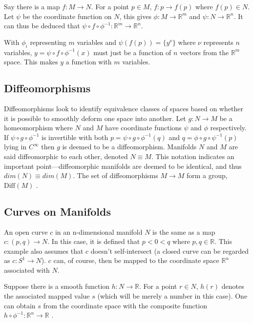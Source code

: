 \documentclass[fleqn, twocolumn, 10pt]{article}
\begin{document}
Say there is a map $f: M \to N$. For a point $p \in M$, $f: p \to f(p)$ where $f(p) \in N$. Let $\psi$ be the coordinate function on $N$, this gives $\phi: M \to \mathbb{R}^m$ and $\psi: N \to \mathbb{R}^n$. It can thus be deduced that $\psi \circ f \circ \phi^{-1} : \mathbb{R}^m \to \mathbb{R}^n$. 

With $\phi_i$ representing $m$ variables and $\psi (f(p))=\{y^\nu \}$ where $\nu$ represents $n$ variables, $y = \psi \circ f \circ \phi^{-1}(x)$ must just be a function of $n$ vectors from the $\mathbb{R}^m$ space. This makes $y$ a function with $m$ variables.


\subsection{Diffeomorphisms}

Diffeomorphisms look to identify equivalence classes of spaces based on whether it is possible to smoothly deform one space into another. Let $g: N \to M$ be a homeomorphism where $N$ and $M$ have coordinate functions $\psi$ and $\phi$ respectively. If $\psi \circ g \circ \phi^{-1}$ is invertible with both $p = \psi \circ g \circ \phi^{-1}(q)$ and $q = \phi \circ g \circ \psi^{-1}(p)$ lying in $C^\infty$ then $g$ is deemed to be a diffeomorphism. Manifolds $N$ and $M$ are said diffeomorphic to each other, denoted $N \equiv M$. This notation indicates an important point---diffeomorphic manifolds are deemed to be identical, and thus $dim(N) \equiv dim(M)$. The set of diffeomorphisms $M \to M$ form a group, $\text{Diff}(M)$ \cite{nakahara2003geometry, sussman2013functional, kai2015lam}.

\subsection{Curves on Manifolds}

An open curve $c$ in an n-dimensional manifold $N$ is the same as a map $c:(p,q) \to N$. In this case, it is defined that $p < 0 < q$ where $p,q \in \mathbb{R}$. This example also assumes that $c$ doesn't self-intersect (a closed curve can be regarded as $c: S^1 \to N$). $c$ can, of course, then be mapped to the coordinate space $\mathbb{R}^n$ associated with $N$.

Suppose there is a smooth function $h: N \to \mathbb{R}$. For a point $r \in N$, $h(r)$ denotes the associated mapped value $s$ (which will be merely a number in this case). One can obtain $s$ from the coordinate space with the composite function $h\circ \phi^{-1}: \mathbb{R}^n \to \mathbb{R}$ \cite{nakahara2003geometry, kai2015lam}.
\end{document}
